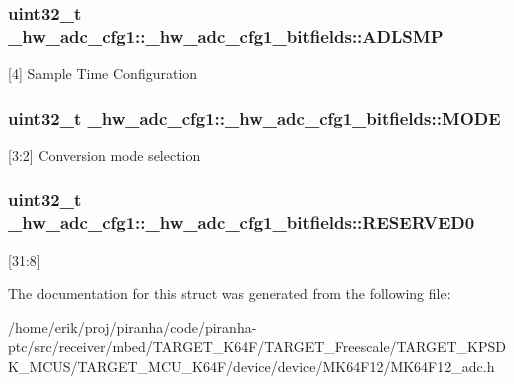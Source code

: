 \subsubsection[{\texorpdfstring{A\+D\+L\+S\+MP}{ADLSMP}}]{\setlength{\rightskip}{0pt plus 5cm}uint32\+\_\+t \+\_\+hw\+\_\+adc\+\_\+cfg1\+::\+\_\+hw\+\_\+adc\+\_\+cfg1\+\_\+bitfields\+::\+A\+D\+L\+S\+MP}\hypertarget{struct__hw__adc__cfg1_1_1__hw__adc__cfg1__bitfields_a765571e3dc18c45f864323fdabf6729a}{}\label{struct__hw__adc__cfg1_1_1__hw__adc__cfg1__bitfields_a765571e3dc18c45f864323fdabf6729a}
\mbox{[}4\mbox{]} Sample Time Configuration 
\subsubsection[{\texorpdfstring{M\+O\+DE}{MODE}}]{\setlength{\rightskip}{0pt plus 5cm}uint32\+\_\+t \+\_\+hw\+\_\+adc\+\_\+cfg1\+::\+\_\+hw\+\_\+adc\+\_\+cfg1\+\_\+bitfields\+::\+M\+O\+DE}\hypertarget{struct__hw__adc__cfg1_1_1__hw__adc__cfg1__bitfields_a5e7efe4e01650b23477f25c2c7f4493e}{}\label{struct__hw__adc__cfg1_1_1__hw__adc__cfg1__bitfields_a5e7efe4e01650b23477f25c2c7f4493e}
\mbox{[}3\+:2\mbox{]} Conversion mode selection 
\subsubsection[{\texorpdfstring{R\+E\+S\+E\+R\+V\+E\+D0}{RESERVED0}}]{\setlength{\rightskip}{0pt plus 5cm}uint32\+\_\+t \+\_\+hw\+\_\+adc\+\_\+cfg1\+::\+\_\+hw\+\_\+adc\+\_\+cfg1\+\_\+bitfields\+::\+R\+E\+S\+E\+R\+V\+E\+D0}\hypertarget{struct__hw__adc__cfg1_1_1__hw__adc__cfg1__bitfields_aced0e1db3a32dc2a9b64a1f0353f0cdd}{}\label{struct__hw__adc__cfg1_1_1__hw__adc__cfg1__bitfields_aced0e1db3a32dc2a9b64a1f0353f0cdd}
\mbox{[}31\+:8\mbox{]} 

The documentation for this struct was generated from the following file\+:\begin{DoxyCompactItemize}
\item 
/home/erik/proj/piranha/code/piranha-\/ptc/src/receiver/mbed/\+T\+A\+R\+G\+E\+T\+\_\+\+K64\+F/\+T\+A\+R\+G\+E\+T\+\_\+\+Freescale/\+T\+A\+R\+G\+E\+T\+\_\+\+K\+P\+S\+D\+K\+\_\+\+M\+C\+U\+S/\+T\+A\+R\+G\+E\+T\+\_\+\+M\+C\+U\+\_\+\+K64\+F/device/device/\+M\+K64\+F12/M\+K64\+F12\+\_\+adc.\+h\end{DoxyCompactItemize}
